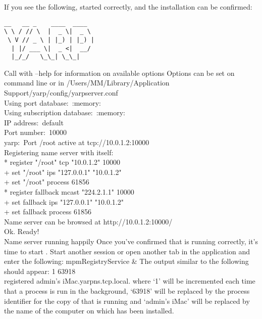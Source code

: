 If you see the following, \yarp{} started correctly, and the \mplusm{} installation can be
confirmed:
\outputBegin{}
\begin{verbatim}
__   __ _    ____  ____  
\ \ / // \  |  _ \|  _ \ 
 \ V // _ \ | |_) | |_) |
  | |/ ___ \|  _ <|  __/ 
  |_/_/   \_\_| \_\_|    
\end{verbatim}
Call with --help for information on available options
Options can be set on command line or in /Users/M\textunderscore{}M/Library/Application\\
\hspace*{5em}Support/yarp/config/yarpserver.conf\\
Using port database:\ :memory:\\
Using subscription database:\ :memory:\\
IP address:\ default\\
Port number:\ 10000\\
yarp:\ Port /root active at tcp://10.0.1.2:10000\\

Registering name server with itself:\\
\hspace*{0.5em}* register "/root" tcp "10.0.1.2" 10000\\
\hspace*{1.6em}+ set "/root" ips "127.0.0.1" "10.0.1.2"\\
\hspace*{1.6em}+ set "/root" process 61856\\
\hspace*{0.5em}* register fallback mcast "224.2.1.1" 10000\\
\hspace*{1.6em}+ set fallback ips "127.0.0.1" "10.0.1.2"\\
\hspace*{1.6em}+ set fallback process 61856\\
Name server can be browsed at http://10.0.1.2:10000/\\

Ok.  Ready!\\
Name server running happily
\outputEnd{}
Once you've confirmed that \yarp{} is running correctly, it's time to start \mplusm{}.
Start another  session or open another tab in the \asCode{Terminal}
application and enter the following:
\outputBegin{}
mpmRegistryService \&
\outputEnd{}
The output similar to the following should appear:
\outputBegin{}
\openSq{}1\closeSq{} 63918\\
registered admin's iMac.\fatUnderscore{}yarpns.\fatUnderscore{}tcp.local.
\outputEnd{}
where `1' will be incremented each time that a process is run in the background, `63918'
will be replaced by the process identifier for the copy of \asCode{mpmRegistryService}
that is running and `admin's iMac' will be replaced by the name of the computer on which
\mplusm{} has been installed.\\

